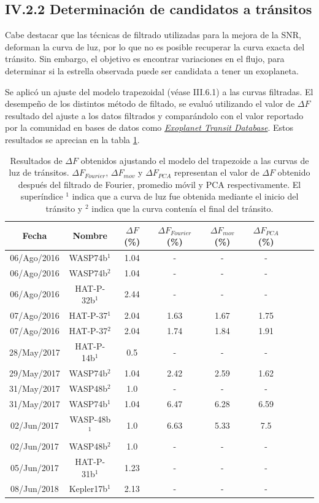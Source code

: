\subsection*{IV.2.2 Determinación de candidatos a tránsitos}

Cabe destacar que las técnicas de filtrado utilizadas para la mejora de la SNR, deforman la curva de luz, por lo que no es posible recuperar la curva exacta del tránsito. Sin embargo, el objetivo es encontrar variaciones en el flujo, para determinar si la estrella observada puede ser candidata a tener un exoplaneta.

Se aplicó un ajuste del modelo trapezoidal (véase III.6.1) a las curvas filtradas. El desempeño de los distintos método de filtado, se evaluó utilizando el valor de $\Delta F$ resultado del ajuste a los datos filtrados y comparándolo con el valor reportado por la comunidad en bases de datos como \href{http://var2.astro.cz/ETD/index.php}{\textit{Exoplanet Transit Database}}. Estos resultados se aprecian en la tabla \ref{tab_resultados_profundidad}.


\begin{table}
	\centering
	\begin{tabular}{ccccccccc}
	\hline 
	Fecha & Nombre & $\Delta F$ (\%) & $\Delta F_{Fourier}$ (\%) &  $\Delta F_{mov}$ (\%) & $\Delta F_{PCA}$ (\%) \\ 
	\hline
	06/Ago/2016 & WASP74b$^{1}$ & 1.04 & - & - & - \\ 
	06/Ago/2016 & WASP74b$^{2}$ & 1.04 & - & - & - \\
	06/Ago/2016 & HAT-P-32b$^{1}$ & 2.44 & - & - & - \\
	07/Ago/2016 & HAT-P-37$^{1}$ & 2.04 & 1.63 & 1.67 & 1.75 \\ 
	07/Ago/2016 & HAT-P-37$^{2}$ & 2.04 & 1.74 & 1.84 & 1.91 \\ 
	28/May/2017 & HAT-P-14b$^{1}$ & 0.5 & - & - & - \\ 
	29/May/2017 & WASP74b$^{2}$ & 1.04 & 2.42 & 2.59 & 1.62 \\ 
	31/May/2017 & WASP48b$^{2}$ & 1.0 & - & - & - \\  
	31/May/2017 & WASP74b$^{1}$ & 1.04 & 6.47 & 6.28 & 6.59 \\
	02/Jun/2017 & WASP-48b$^{1}$ & 1.0 & 6.63 & 5.33 & 7.5 \\
	02/Jun/2017 & WASP48b$^{2}$ & 1.0 & - & - & - \\
	05/Jun/2017 & HAT-P-31b$^{1}$ & 1.23 & - & - & - \\
	08/Jun/2018 & Kepler17b$^{1}$ & 2.13 & - & - & - \\ 
	\hline 
	\end{tabular} 
	\caption{Resultados de $\Delta F$ obtenidos ajustando el modelo del trapezoide a las curvas de luz de tránsitos. $\Delta F_{Fourier}$, $\Delta F_{mov}$ y $\Delta F_{PCA}$ representan el valor de $\Delta F$ obtenido después del filtrado de Fourier, promedio móvil y PCA respectivamente. El superíndice $^{1}$ indica que a curva de luz fue obtenida mediante el inicio del tránsito y $^{2}$ indica que la curva contenía el final del tránsito.}
	\label{tab_resultados_profundidad}
	\end{table}

